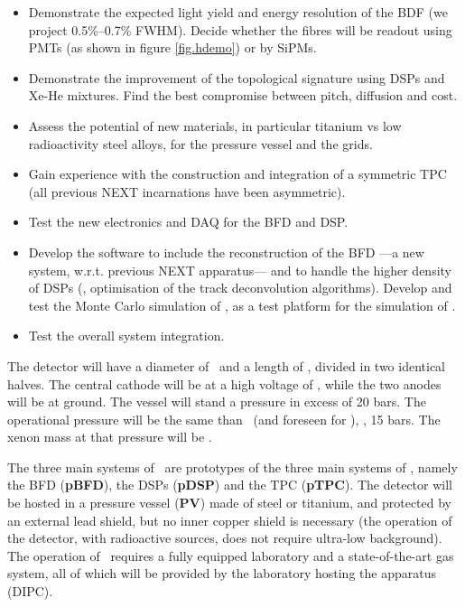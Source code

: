 \begin{itemize}[noitemsep,topsep=0pt,parsep=0pt,partopsep=0pt]
\item Demonstrate the expected light yield and energy resolution of the BDF (we project 0.5\%--0.7\% FWHM). Decide whether the fibres will be readout using PMTs (as shown in figure \ref{fig.hdemo}) or by SiPMs. 
\item Demonstrate the improvement of the topological signature using DSPs and Xe-He mixtures. Find the best compromise between pitch, diffusion and cost. 
\item Assess the potential of new materials, in particular titanium vs low radioactivity steel alloys, for the pressure vessel and the grids. 
\item Gain experience with the construction and integration of a symmetric TPC (all previous NEXT incarnations have been asymmetric). 
\item Test the new electronics and DAQ for the BFD and DSP.
\item Develop the software to include the reconstruction of the BFD ---a new system, w.r.t. previous NEXT apparatus--- and to handle the higher density of DSPs (\eg, optimisation of the track deconvolution algorithms). Develop and test the Monte Carlo simulation of \HDEMO, as a test platform for the simulation of \NHD. 
\item Test the overall system integration. 
\end{itemize}

\indent


The detector will have a diameter of \HDD\ and a length of \HDL, divided in two identical halves. The central cathode will be at a high voltage of \HDHV, while the two anodes will be at ground. The vessel will stand a pressure in excess of 20 bars. The operational pressure will be the same than \Next\ (and foreseen for \NHD), \eg, 15 bars. The xenon mass at that pressure will be \HDM. 

\indent


The three main systems of \HDEMO\ are  prototypes of the three main systems of \NHD, namely the BFD ({\bf pBFD}), the DSPs ({\bf pDSP}) and  the TPC ({\bf pTPC}). The detector will be hosted in a pressure vessel ({\bf PV}) made of steel or titanium, and protected by an external lead shield, but no inner copper shield is necessary (the operation of the detector, with radioactive sources, does not require ultra-low background). The operation of \HDEMO\ requires a fully equipped laboratory and a state-of-the-art gas system, all of which will be provided by the laboratory hosting the apparatus (DIPC). 


